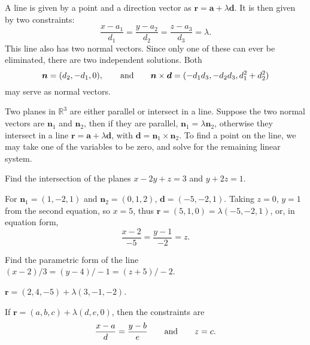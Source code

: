 \documentclass[letter-paper]{tufte-book}
\newenvironment{example}[1][Example]{\begin{trivlist}
\item[\hskip \labelsep {\bfseries #1}]}{\end{trivlist}}
\newcommand{\ab}{\boldsymbol{a}}
\newcommand{\db}{\boldsymbol{d}}
\newcommand{\nb}{\boldsymbol{n}}
\begin{document}
A line is given by a point and a direction vector as
$\boldsymbol{r}=\ab+\lambda\db$. It is then given by two constraints:
\begin{equation*}
	\frac{x-a_1}{d_1}=\frac{y-a_2}{d_2}=\frac{z-a_3}{d_3}=\lambda.
\end{equation*}
This line also has two normal vectors. Since only one of these can ever be
eliminated, there are two independent solutions. Both
\begin{equation*}
	\nb=(d_2, -d_1, 0),\qquad\textnormal{and}\qquad
	\nb\times\db=(-d_1 d_3, -d_2 d_3, d_1^2 + d_2^2)
\end{equation*}
may serve as normal vectors.

Two planes in $\mathbb{R}^3$ are either parallel or intersect in a line. Suppose
the two normal vectors are $\nb_1$ and $\nb_2$, then if they are parallel,
$\nb_1=\lambda \nb_2$, otherwise they intersect in a line
$\boldsymbol{r}=\ab+\lambda\db$, with $\db=\nb_1\times\nb_2$. To find a point on
the line, we may take one of the variables to be zero, and solve for the
remaining linear system.
\begin{example}
	Find the intersection of the planes $x-2y+z=3$ and $y+2z=1$.
	
	For $\nb_1=(1,-2,1)$ and $\nb_2=(0,1,2)$, $\db=(-5,-2,1)$. Taking $z=0$,
	$y=1$ from the second equation, so $x=5$, thus
	$\boldsymbol{r}=(5,1,0)=\lambda(-5,-2,1)$, or, in equation form,
	\begin{equation*}
		\frac{x-2}{-5}=\frac{y-1}{-2}=z.
	\end{equation*}
\end{example}
\begin{example}
	Find the parametric form of the line $(x-2)/3=(y-4)/-1=(z+5)/-2$.
	
	$\boldsymbol{r}=(2,4,-5)+\lambda(3,-1,-2)$.
\end{example}

If $\boldsymbol{r}=(a,b,c)+\lambda(d,e,0)$, then the constraints are
\begin{equation*}
	\frac{x-a}{d}=\frac{y-b}{e}\qquad\textnormal{and}\qquad z=c.
\end{equation*}
\end{document}
